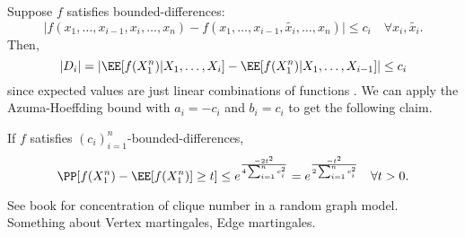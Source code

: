 Suppose $f$ satisfies bounded-differences: 
\[\vert f(x_1,\hdots,x_{i-1},x_i,\hdots,x_n) - f(x_1,\hdots,x_{i-1},\tilde{x_i},\hdots,x_n)\vert\leq c_i\quad \forall x_i,\tilde{x_i}.\] 
Then,
\[\vert D_i\vert = \vert\EE[f(X_1^n)|X_1,\hdots,X_i] - \EE[f(X_1^n)|X_1,\hdots,X_{i-1}]\vert \leq c_i\]
since expected values are just linear combinations of functions . We can apply the Azuma-Hoeffding bound with $a_i=-c_i$ and $b_i=c_i$ to get the following claim.   
\begin{theorem}
\claimlabel

If $f$ satisfies $(c_i)_{i=1}^n$-bounded-differences,
\[\PP[f(X_1^n) - \EE[f(X_1^n)]\geq t]\leq e^{\frac{-2t^2}{4\sum_{i=1}^nc_i^2}} = e^{\frac{-t^2}{2\sum_{i=1}^n c_i^2}}\quad \forall t>0.\] 
\end{theorem}
\begin{example}
\exlabel

See book for concentration of clique number in a random graph model. Something about Vertex martingales, Edge martingales. 
\end{example}


